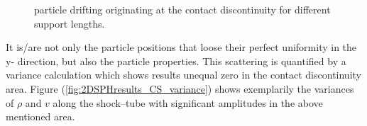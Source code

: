 \documentclass{report}
\begin{document}
\begin{figure}[!htbp]
\centering
\label{fig:2DSPHresults_CS_drifting}

\caption[Particle drifting for 2D distribution]{particle drifting originating at the contact discontinuity for different support lengths.}

\end{figure}

It is/are not only the particle positions that loose their perfect uniformity in the y- direction, but also the particle properties. This scattering is quantified by a variance calculation which shows results unequal zero in the contact discontinuity area.
Figure (\ref{fig:2DSPHresults_CS_variance}) shows exemplarily the variances of $\rho$ and $v$ along the shock--tube with significant amplitudes in the above mentioned area.
\end{document}
